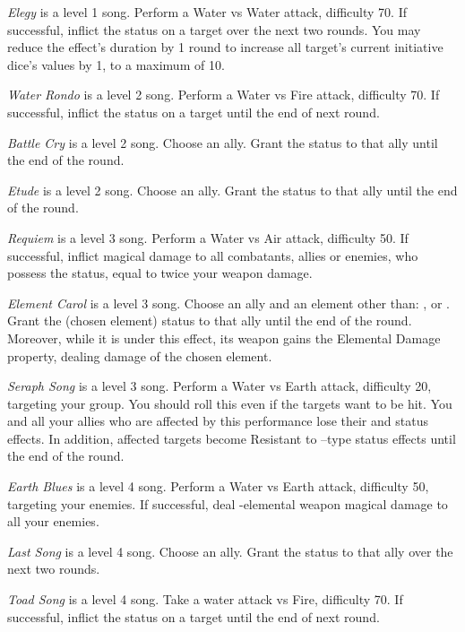 \begin{multicols}{2}
    \textit{Elegy} is a level 1 song. Perform a Water vs Water attack, difficulty 70. If successful, inflict the  status on a target over the next two rounds. You may reduce the effect's duration by 1 round to increase all target's current initiative dice's values by 1, to a maximum of 10.
    
    \textit{Water Rondo} is a level 2 song. Perform a Water vs Fire attack, difficulty 70. If successful, inflict the  status on a target until the end of next round.
    
    \textit{Battle Cry} is a level 2 song. Choose an ally. Grant the  status to that ally until the end of the round.
    
    \textit{Etude} is a level 2 song. Choose an ally. Grant the  status to that ally until the end of the round.
    
    \textit{Requiem} is a level 3 song. Perform a Water vs Air attack, difficulty 50. If successful, inflict magical damage to all combatants, allies or enemies, who possess the  status, equal to twice your weapon damage.
    
    \textit{Element Carol} is a level 3 song. Choose an ally and an element other than: ,  or . Grant the  (chosen element) status to that ally until the end of the round. Moreover, while it is under this effect, its weapon gains the Elemental Damage property, dealing damage of the chosen element.
    
    \textit{Seraph Song} is a level 3 song. Perform a Water vs Earth attack, difficulty 20, targeting your group. You should roll this even if the targets want to be hit. You and all your allies who are affected by this performance lose their  and  status effects. In addition, affected targets become Resistant to –type status effects until the end of the round.

    \textit{Earth Blues} is a level 4 song. Perform a Water vs Earth attack, difficulty 50, targeting your enemies. If successful, deal -elemental weapon magical damage to all your enemies.
    
    \textit{Last Song} is a level 4 song. Choose an ally. Grant the  status to that ally over the next two rounds.
    
    \textit{Toad Song} is a level 4 song. Take a water attack vs Fire, difficulty 70. If successful, inflict the  status on a target until the end of next round.
    

\end{multicols}
